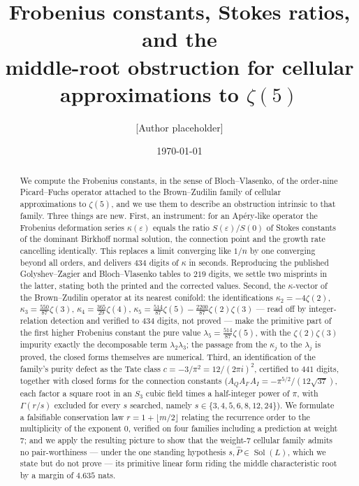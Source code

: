 \documentclass[11pt,reqno]{amsart}
\theoremstyle{plain}
\theoremstyle{definition}
\theoremstyle{remark}
\newcommand{\eps}{\varepsilon}
\DeclareMathOperator{\Sol}{Sol}
\newcommand{\Phat}{\widehat{P}}
\begin{document}
\title[Frobenius constants and the middle-root obstruction]
      {Frobenius constants, Stokes ratios, and the\\ middle-root obstruction for cellular
       approximations to $\zeta(5)$}

\author{[Author placeholder]}
\address{[Address placeholder]}

\date{\today}


\begin{abstract}
We compute the Frobenius constants, in the sense of Bloch--Vlasenko, of the order-nine
Picard--Fuchs operator attached to the Brown--Zudilin family of cellular approximations to
$\zeta(5)$, and we use them to describe an obstruction intrinsic to that family. Three
things are new. First, an instrument: for an Ap\'ery-like operator the Frobenius deformation
series $\kappa(\eps)$ equals the ratio $S(\eps)/S(0)$ of Stokes constants of the dominant
Birkhoff normal solution, the connection point and the growth rate cancelling identically.
This replaces a limit converging like $1/n$ by one converging beyond all orders, and delivers
$434$ digits of $\kappa$ in seconds. Reproducing the published Golyshev--Zagier and
Bloch--Vlasenko tables to $219$ digits, we settle two misprints in the latter, stating both the
printed and the corrected values. Second, the $\kappa$-vector of the Brown--Zudilin operator at
its nearest conifold: the identifications $\kappa_2=-4\zeta(2)$, $\kappa_3=\tfrac{550}{87}\zeta(3)$,
$\kappa_4=\tfrac{365}{29}\zeta(4)$,
$\kappa_5=\tfrac{514}{87}\zeta(5)-\tfrac{2200}{87}\zeta(2)\zeta(3)$ --- read off by
integer-relation detection and verified to $434$ digits, not proved --- make the primitive part
of the first higher Frobenius constant the pure value $\lambda_5=\tfrac{514}{87}\zeta(5)$, with
the $\zeta(2)\zeta(3)$ impurity exactly the decomposable term $\lambda_2\lambda_3$; the passage
from the $\kappa_j$ to the $\lambda_j$ is proved, the closed forms themselves are numerical.
Third, an
identification of the family's purity defect as the Tate class $c=-3/\pi^{2}=12/(2\pi i)^{2}$,
certified to $441$ digits, together with closed forms for the connection constants
($A_QA_{I'}A_I=-\pi^{5/2}/(12\sqrt{37})$, each factor a square root in an $S_3$ cubic field
times a half-integer power of $\pi$, with $\Gamma(r/s)$ excluded for every $s$ searched, namely
$s\in\{3,4,5,6,8,12,24\}$). We formulate a
falsifiable conservation law $r=1+\lfloor m/2\rfloor$ relating the recurrence order to the
multiplicity of the exponent $0$, verified on four families including a prediction at weight
$7$; and we apply the resulting picture to show that the weight-$7$ cellular family admits no
pair-worthiness --- under the one standing hypothesis $s,\Phat\in\Sol(L)$, which we state but do
not prove --- its primitive linear form riding the middle characteristic root by a margin of
$4.635$ nats.
\end{abstract}
\end{document}
